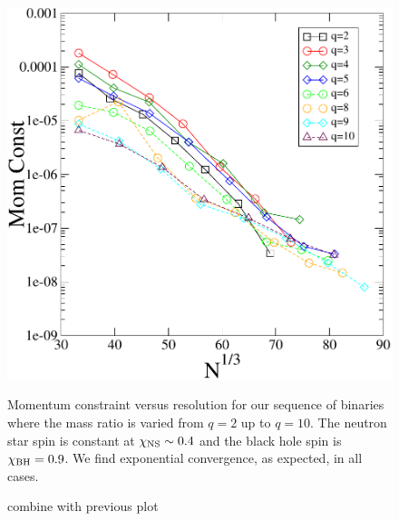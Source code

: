\begin{figure}
\includegraphics[width=0.95\columnwidth]{chap4/qSeqMom}
\caption[Momemntum constraint for the $q$
sequence.]{\red combine with previous plot}{\label{fig:qSeqMom}Momentum constraint versus resolution
  for our sequence of binaries where the mass ratio is varied from
  $q=2$ up to $q=10$. The neutron star spin is constant at $\chi_{\rm
    NS}\sim 0.4$ and the black hole spin is $\chi_{\rm BH}=0.9$. We
  find exponential convergence, as expected, in all cases.}
 
\end{figure}

